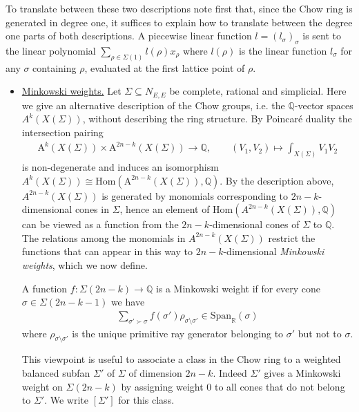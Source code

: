 \documentclass[12pt,a4paper,english]{scrartcl}
\newcommand{\QQ}{\mathbb{Q}}
\newcommand{\RR}{\mathbb{R}}
\newcommand{\ChowGrp}{\mathrm{A}}
\begin{document}
To translate between these two descriptions note first that, since the Chow ring is generated in degree one, it suffices to explain how to translate between the degree one parts of both descriptions. A piecewise linear function $l=(l_\sigma)_\sigma$ is sent to the linear polynomial $\sum_{\rho \in \Sigma(1)}l(\rho)x_\rho$ where $l(\rho)$ is the linear function $l_\sigma$ for any $\sigma$ containing $\rho$, evaluated at the first lattice point of $\rho$.

\begin{itemize} 
    \item \underline{Minkowski weights.} Let $\Sigma \subseteq N_{E,E}$ be complete, rational and simplicial. Here we give an alternative description of the Chow groups, i.e. the $\QQ$-vector spaces $A^k(X(\Sigma))$, without describing the ring structure. By Poincaré duality the intersection pairing \begin{align*}
    \ChowGrp^k(X(\Sigma))\times \ChowGrp^{2n-k}(X(\Sigma))\to \QQ, \qquad (V_1,V_2)\mapsto \int_{X(\Sigma)} V_1V_2
    \end{align*}
    is non-degenerate and induces an isomorphism $A^k(X(\Sigma))\cong \text{Hom}(\ChowGrp^{2n-k}(X(\Sigma)),\QQ)$. By the description above, $A^{2n-k}(X(\Sigma))$ is generated by monomials corresponding to $2n-k$-dimensional cones in $\Sigma$, hence an element of $\text{Hom}(A^{2n-k}(X(\Sigma)),\QQ)$ can be viewed as a function from the $2n-k$-dimensional cones of $\Sigma$ to $\QQ$. The relations among the monomials in $A^{2n-k}(X(\Sigma))$ restrict the functions that can appear in this way to $2n-k$-dimensional \emph{Minkowski weights}, which we now define. 
    
    A function $f \colon \Sigma(2n-k)\to \QQ$ is a Minkowski weight if for every cone $\sigma \in \Sigma(2n-k-1)$ we have \begin{align*}
        \sum_{\sigma'\succ \sigma}f(\sigma')\rho_{\sigma\setminus \sigma'}\in \text{Span}_\RR(\sigma)
    \end{align*}
    where $\rho_{\sigma\setminus \sigma'}$ is the unique primitive ray generator belonging to $\sigma'$ but not to $\sigma$.

    This viewpoint is useful to associate a class in the Chow ring to a weighted balanced subfan $\Sigma'$ of $\Sigma$ of dimension $2n-k$. Indeed $\Sigma'$  gives a Minkowski weight on $\Sigma(2n-k)$ by assigning weight 0 to all cones that do not belong to $\Sigma'$. We write $[\Sigma']$ for this class.
\end{itemize}
\end{document}

